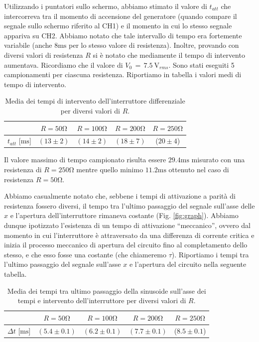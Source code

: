 Utilizzando i puntatori sullo schermo, abbiamo stimato il valore di $t_{att}$ che intercorreva tra il momento di accensione del generatore (quando compare il segnale sullo schermo riferito al CH1) e il momento in cui lo stesso segnale appariva su CH2. Abbiamo notato che tale intervallo di tempo era fortemente variabile (anche $8\si{\milli\second}$ per lo stesso valore di resistenza). Inoltre, provando con diversi valori di resistenza $R$ si è notato che mediamente il tempo di intervento aumentava. Ricordiamo che il valore di $V_0 \, = \, \SI{7.5}{\volt}_{rms}$. Sono stati eseguiti 5 campionamenti per ciascuna resistenza. Riportiamo in tabella i valori medi di tempo di intervento.

\begin{table}[h]
\centering
\caption{Media dei tempi di intervento dell'interruttore differenziale per diversi valori di $R$.}
{\renewcommand{\arraystretch}{1.6}%
\begin{tabular}{c|c|c|c|c}
 & $R=50 \si{\ohm}$ & $R=100 \si{\ohm}$ & $R=200 \si{\ohm}$ & $R=250 \si{\ohm}$ \\      \hline
$t_{att}$ [$\si{\milli\second}$] & $(13 \pm 2)$ & $(14 \pm 2)$ & $(18 \pm 7)$ & ($20 \pm 4$) \\\end{tabular}}
\end{table}


Il valore massimo di tempo campionato risulta essere $29.4\si{\milli\second}$ misurato con una resistenza di $R=250 \si{\ohm}$ mentre quello minimo $11.2\si{\milli\second}$ ottenuto nel caso di resistenza $R=50 \si{\ohm}$.

Abbiamo casualmente notato che, sebbene i tempi di attivazione a parità di resistenza fossero diversi, il tempo tra l'ultimo passaggio del segnale sull'asse delle $x$ e l'apertura dell'interruttore rimaneva costante (Fig. \ref{fig:graph}). Abbiamo dunque ipotizzato l'esistenza di un tempo di attivazione ``meccanico'', ovvero dal momento in cui l'interruttore è attraversato da una differenza di corrente critica e inizia il processo meccanico di apertura del circuito fino al completamento dello stesso, e che esso fosse una costante (che chiameremo $\tau$).  Riportiamo i tempi tra l'ultimo passaggio del segnale sull'asse $x$ e l'apertura del circuito nella seguente tabella. 

\begin{table}[h]
\centering
\parbox{14 cm}{\caption{Media dei tempi tra ultimo passaggio della sinusoide sull'asse dei tempi e intervento dell'interruttore per diversi valori di $R$.}}
{\renewcommand{\arraystretch}{1.6}%
\begin{tabular}{c|c|c|c|c}
 & $R=50 \si{\ohm}$ & $R=100 \si{\ohm}$ & $R=200 \si{\ohm}$ & $R=250 \si{\ohm}$ \\      \hline
$\Delta t$ [$\si{\milli\second}$] & $(5.4 \pm 0.1)$ & $(6.2 \pm 0.1)$ & $(7.7 \pm 0.1)$ & ($8.5 \pm 0.1$) \\
\end{tabular}}
\end{table}

